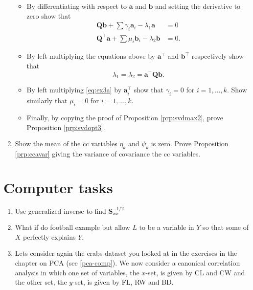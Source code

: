 \documentclass[]{book}
\theoremstyle{definition}
\theoremstyle{definition}
\theoremstyle{definition}
\theoremstyle{remark}
\begin{document}
\begin{enumerate}
  \begin{itemize}
  \item
    By differentiating with respect to \(\boldsymbol a\) and \(\boldsymbol b\) and setting the derivative to zero show that
    \begin{align}
     \boldsymbol Q\boldsymbol b+ \sum\gamma_i \boldsymbol a_i - \lambda_1 \boldsymbol a&= 0 \label{eq:ex3a}\\
     \boldsymbol Q^\top\boldsymbol a+ \sum\mu_i \boldsymbol b_i - \lambda_2 \boldsymbol b&= 0. \label{eq:ex3b} 
     \end{align}
  \item
    By left multiplying the equations above by \(\boldsymbol a^\top\) and \(\boldsymbol b^\top\) respectively show that
    \[\lambda_1=\lambda_2 = \boldsymbol a^\top \boldsymbol Q\boldsymbol b.\]
  \item
    By left multiplying \eqref{eq:ex3a} by \(\boldsymbol a_i^\top\) show that \(\gamma_i=0\) for \(i=1, \ldots, k\). Show similarly that \(\mu_i =0\) for \(i=1, \ldots, k\).
  \item
    Finally, by copying the proof of Proposition \ref{prp:svdmax2}, prove Proposition \ref{prp:svdopt3}.
  \end{itemize}
\item
  Show the mean of the cc variables \(\eta_k\) and \(\psi_k\) is zero. Prove Proposition \ref{prp:ccavar} giving the variance of covariance the cc variables.
\end{enumerate}

\hypertarget{computer-tasks-1}{%
\section{Computer tasks}\label{computer-tasks-1}}

\begin{enumerate}
\def\labelenumi{\arabic{enumi}.}
\item
  Use generalized inverse to find \(\boldsymbol S_{xx}^{-1/2}\)
\item
  What if do football example but allow \(L\) to be a variable in \(Y\) so that some of \(X\) perfectly explains \(Y\).
\item
  Lets consider again the crabs dataset you looked at in the exercises in the chapter on PCA (see \ref{pca-comp}).
  We now consider a canonical correlation analysis in which one set of variables, the \(x\)-set, is given by CL and CW and the
  other set, the \(y\)-set, is given by FL, RW and BD.
\end{enumerate}
\end{document}
